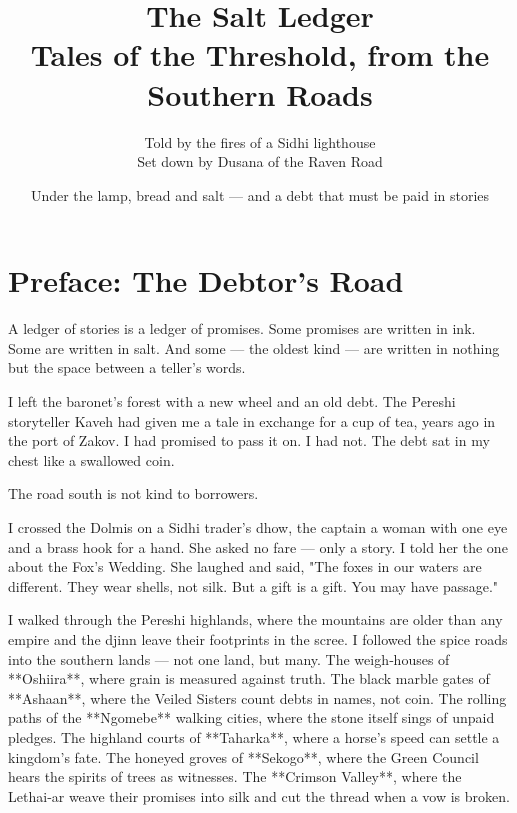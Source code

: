 \documentclass[10pt,twoside]{book}
\begin{document}
\title{\Huge\textbf{The Salt Ledger}\\ \large Tales of the Threshold, from the Southern Roads}
\author{Told by the fires of a Sidhi lighthouse\\ \small Set down by Dusana of the Raven Road}
\date{Under the lamp, bread and salt --- and a debt that must be paid in stories}
\maketitle

\tableofcontents

\chapter*{Preface: The Debtor's Road}

A ledger of stories is a ledger of promises. Some promises are written in ink. Some are written in salt. And some --- the oldest kind --- are written in nothing but the space between a teller's words.

I left the baronet's forest with a new wheel and an old debt. The Pereshi storyteller Kaveh had given me a tale in exchange for a cup of tea, years ago in the port of Zakov. I had promised to pass it on. I had not. The debt sat in my chest like a swallowed coin.

The road south is not kind to borrowers.

I crossed the Dolmis on a Sidhi trader's dhow, the captain a woman with one eye and a brass hook for a hand. She asked no fare --- only a story. I told her the one about the Fox's Wedding. She laughed and said, "The foxes in our waters are different. They wear shells, not silk. But a gift is a gift. You may have passage."

I walked through the Pereshi highlands, where the mountains are older than any empire and the djinn leave their footprints in the scree. I followed the spice roads into the southern lands --- not one land, but many. The weigh‑houses of **Oshiira**, where grain is measured against truth. The black marble gates of **Ashaan**, where the Veiled Sisters count debts in names, not coin. The rolling paths of the **Ngomebe** walking cities, where the stone itself sings of unpaid pledges. The highland courts of **Taharka**, where a horse's speed can settle a kingdom's fate. The honeyed groves of **Sekogo**, where the Green Council hears the spirits of trees as witnesses. The **Crimson Valley**, where the Lethai‑ar weave their promises into silk and cut the thread when a vow is broken.
\end{document}

